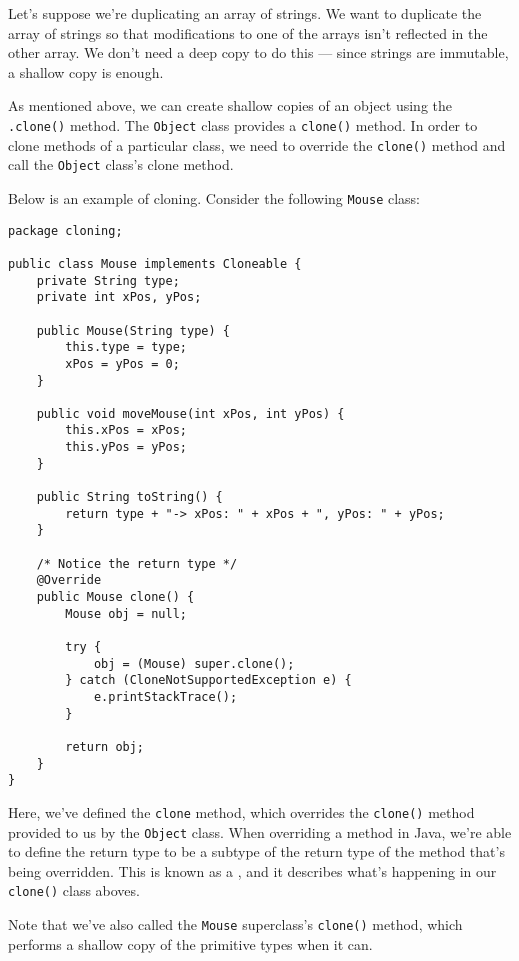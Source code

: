 Let's suppose we're duplicating an array of strings. We want to duplicate the array of strings so that modifications to one of the arrays isn't reflected in the other array. We don't need a deep copy to do this --- since strings are immutable, a shallow copy is enough. 

As mentioned above, we can create shallow copies of an object using the \verb!.clone()! method. The \verb!Object! class provides a \verb!clone()! method. In order to clone methods of a particular class, we need to override the \verb!clone()! method and call the \verb!Object! class's clone method. 

Below is an example of cloning. Consider the following \verb!Mouse! class:

\begin{lstlisting}
package cloning;

public class Mouse implements Cloneable {
	private String type;
	private int xPos, yPos;

	public Mouse(String type) {
		this.type = type;
		xPos = yPos = 0;
	}

	public void moveMouse(int xPos, int yPos) {
		this.xPos = xPos;
		this.yPos = yPos;
	}

	public String toString() {
		return type + "-> xPos: " + xPos + ", yPos: " + yPos;
	}

	/* Notice the return type */
	@Override
	public Mouse clone() {
		Mouse obj = null;

		try {
			obj = (Mouse) super.clone();
		} catch (CloneNotSupportedException e) {
			e.printStackTrace();
		}

		return obj;
	}
}
\end{lstlisting}

Here, we've defined the \verb!clone! method, which overrides the \verb!clone()! method provided to us by the \verb!Object! class. When overriding a method in Java, we're able to define the return type to be a subtype of the return type of the method that's being overridden. This is known as a , and it describes what's happening in our \verb!clone()! class aboves.

Note that we've also called the \verb!Mouse! superclass's \verb!clone()! method, which performs a shallow copy of the primitive types when it can. 
